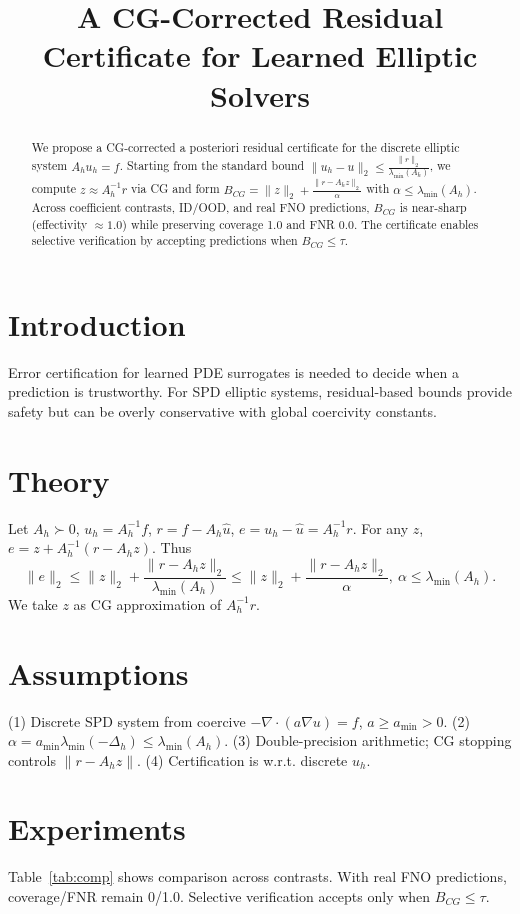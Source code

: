\documentclass[conference]{IEEEtran}
\title{A CG-Corrected Residual Certificate for Learned Elliptic Solvers}
\author{\IEEEauthorblockN{certno}
\IEEEauthorblockA{Research Program on Error-Certified Neural Operators\\
\texttt{https://github.com/emmettv1191/certno-phd-research}}
}
\begin{document}
\maketitle

\begin{abstract}
We propose a CG-corrected a posteriori residual certificate for the discrete elliptic system $A_h u_h = f$. Starting from the standard bound $\|u_h-\hat{u}\|_2 \le \frac{\|r\|_2}{\lambda_{\min}(A_h)}$, we compute $z \approx A_h^{-1}r$ via CG and form $B_{CG} = \|z\|_2 + \frac{\|r-A_h z\|_2}{\alpha}$ with $\alpha \le \lambda_{\min}(A_h)$. Across coefficient contrasts, ID/OOD, and real FNO predictions, $B_{CG}$ is near-sharp (effectivity $\approx 1.0$) while preserving coverage 1.0 and FNR 0.0. The certificate enables selective verification by accepting predictions when $B_{CG} \le \tau$.
\end{abstract}

\section{Introduction}
Error certification for learned PDE surrogates is needed to decide when a prediction is trustworthy. For SPD elliptic systems, residual-based bounds provide safety but can be overly conservative with global coercivity constants.

\section{Theory}
Let $A_h \succ 0$, $u_h=A_h^{-1}f$, $r=f-A_h\hat{u}$, $e=u_h-\hat{u}=A_h^{-1}r$. For any $z$, $e=z+A_h^{-1}(r-A_h z)$. Thus
$$
\|e\|_2 \le \|z\|_2 + \frac{\|r-A_h z\|_2}{\lambda_{\min}(A_h)} \le \|z\|_2 + \frac{\|r-A_h z\|_2}{\alpha},\ \alpha\le\lambda_{\min}(A_h).
$$
We take $z$ as CG approximation of $A_h^{-1}r$.

\section{Assumptions}
(1) Discrete SPD system from coercive $-\nabla\cdot(a\nabla u)=f$, $a\ge a_{\min}>0$. (2) $\alpha=a_{\min}\lambda_{\min}(-\Delta_h)\le\lambda_{\min}(A_h)$. (3) Double-precision arithmetic; CG stopping controls $\|r-A_h z\|$. (4) Certification is w.r.t. discrete $u_h$.

\section{Experiments}
Table~\ref{tab:comp} shows comparison across contrasts. With real FNO predictions, coverage/FNR remain 0/1.0. Selective verification accepts only when $B_{CG}\le\tau$.
\end{document}
